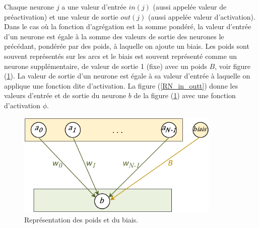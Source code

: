Chaque neurone $j$ a une valeur d'entrée $in(j)$ (aussi appelée valeur de préactivation) et une valeur de sortie $out(j)$ (aussi appelée valeur d'activation). Dans le cas où la fonction d'agrégation est la somme pondéré, la valeur d'entrée d'un neurone est égale à la somme des valeurs de sortie des neurones le précédant, pondérée par des poids, à laquelle on ajoute un biais. Les poids sont souvent représentés sur les arcs et le biais est souvent représenté comme un neurone supplémentaire, de valeur de sortie 1 (fixe) avec un poids $B$, voir figure (\ref{RN_poids_biais}). La valeur de sortie d'un neurone est égale à sa valeur d'entrée à laquelle on applique une fonction dite d'activation. La figure (\ref{RN_in_outt}) donne les valeurs d'entrée et de sortie du neurone $b$ de la figure (\ref{RN_poids_biais}) avec une fonction d'activation $\phi$.

\begin{figure}[H]
	\centerline{
		\includegraphics[height=5cm]{images_these/RN_poids_biais.pdf}}
	\caption[Représentation des poids et du biais. ]{Représentation des poids et du biais.}
	\label{RN_poids_biais}
\end{figure}

